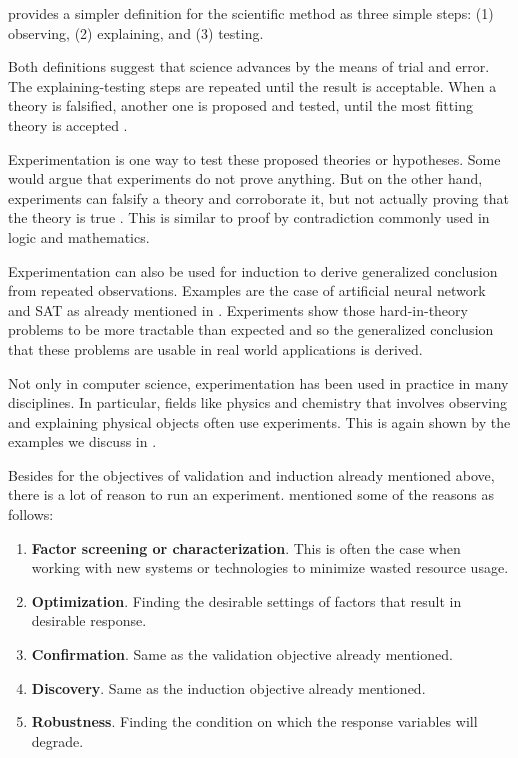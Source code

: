 \citet{careyBeginnerGuideScientific2012} provides a simpler definition for the scientific method as three simple steps:
 (1) observing, (2) explaining, and (3) testing.


Both definitions suggest that science advances by the means of trial and error.
The explaining-testing steps are repeated until the result is acceptable.
When a theory is falsified, another one is proposed and tested, until the most fitting theory is accepted \citep{wallimanResearchMethodsBasics2010a}.

Experimentation is one way to test these proposed theories or hypotheses.
Some would argue that experiments do not prove anything.
But on the other hand, experiments can falsify a theory and corroborate it, but not actually proving that the theory is true \citep{tichyShouldComputerScientists1998}.
This is similar to proof by contradiction commonly used in logic and mathematics.

Experimentation can also be used for induction to derive generalized conclusion from repeated observations.
Examples are the case of artificial neural network and SAT as already mentioned in .
Experiments show those hard-in-theory problems to be more tractable than expected and so the generalized conclusion that these problems are usable in real world applications is derived.

Not only in computer science, experimentation has been used in practice in many disciplines.
In particular, fields like physics and chemistry that involves observing and explaining physical objects often use experiments.
This is again shown by the examples we discuss in .

Besides for the objectives of validation and induction already mentioned above, there is a lot of reason to run an experiment.
\citet{montgomeryDesignAnalysisExperiments2013} mentioned some of the reasons as follows:
\begin {enumerate}[noitemsep]
	\item \textbf{Factor screening or characterization}. This is often the case when working with new systems or technologies to minimize wasted resource usage.
	\item \textbf{Optimization}. Finding the desirable settings of factors that result in desirable response.
	\item \textbf{Confirmation}. Same as the validation objective already mentioned.
	\item \textbf{Discovery}. Same as the induction objective already mentioned.
	\item \textbf{Robustness}. Finding the condition on which the response variables will degrade.
\end{enumerate}

